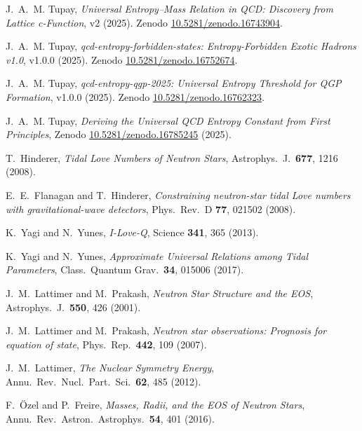 \documentclass[11pt]{article}
\begin{document}
\begin{thebibliography}{99}\setlength{\itemsep}{0.2em}

J.~A.~M. Tupay, \emph{Universal Entropy--Mass Relation in QCD: Discovery from Lattice c-Function}, v2 (2025).
Zenodo \href{https://doi.org/10.5281/zenodo.16743904}{10.5281/zenodo.16743904}.

J.~A.~M. Tupay, \emph{qcd-entropy-forbidden-states: Entropy-Forbidden Exotic Hadrons v1.0}, v1.0.0 (2025).
Zenodo \href{https://doi.org/10.5281/zenodo.16752674}{10.5281/zenodo.16752674}.

J.~A.~M. Tupay, \emph{qcd-entropy-qgp-2025: Universal Entropy Threshold for QGP Formation}, v1.0.0 (2025).
Zenodo \href{https://doi.org/10.5281/zenodo.16762323}{10.5281/zenodo.16762323}.

J.~A.~M. Tupay, \emph{Deriving the Universal QCD Entropy Constant from First Principles}, Zenodo \href{https://doi.org/10.5281/zenodo.16785245}{10.5281/zenodo.16785245} (2025).

T.~Hinderer, \emph{Tidal Love Numbers of Neutron Stars}, Astrophys.\ J.\ \textbf{677}, 1216 (2008).

E.~E.~Flanagan and T.~Hinderer, \emph{Constraining neutron-star tidal Love numbers with gravitational-wave detectors}, Phys.\ Rev.\ D \textbf{77}, 021502 (2008).

K.~Yagi and N.~Yunes, \emph{I-Love-Q}, Science \textbf{341}, 365 (2013).

K.~Yagi and N.~Yunes, \emph{Approximate Universal Relations among Tidal Parameters}, Class.\ Quantum Grav.\ \textbf{34}, 015006 (2017).

J.~M.~Lattimer and M.~Prakash, \emph{Neutron Star Structure and the EOS}, Astrophys.\ J.\ \textbf{550}, 426 (2001).

J.~M.~Lattimer and M.~Prakash, \emph{Neutron star observations: Prognosis for equation of state}, Phys.\ Rep.\ \textbf{442}, 109 (2007).

J.~M.~Lattimer, \emph{The Nuclear Symmetry Energy}, Annu.\ Rev.\ Nucl.\ Part.\ Sci.\ \textbf{62}, 485 (2012).

F.~\"Ozel and P.~Freire, \emph{Masses, Radii, and the EOS of Neutron Stars}, Annu.\ Rev.\ Astron.\ Astrophys.\ \textbf{54}, 401 (2016).


\end{thebibliography}
\end{document}
